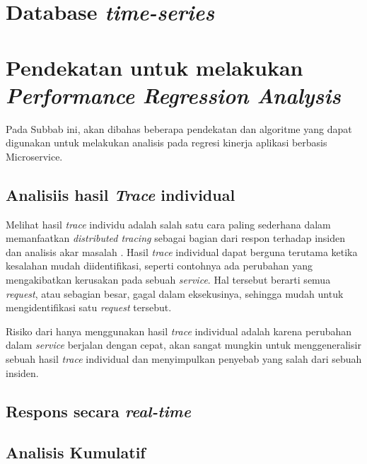 \section{Database \textit{time-series}}

\section{Pendekatan untuk melakukan \textit{Performance Regression Analysis}}
Pada Subbab ini, akan dibahas beberapa pendekatan dan algoritme yang dapat digunakan untuk melakukan analisis pada regresi kinerja aplikasi berbasis Microservice.
\label{ch2-algo}


\subsection{Analisiis hasil \textit{Trace} individual}
Melihat hasil \textit{trace} individu adalah salah satu cara paling sederhana dalam memanfaatkan \textit{distributed tracing} sebagai bagian dari respon terhadap insiden dan analisis akar masalah \citep{parker2020distributed}. Hasil \textit{trace} individual dapat berguna terutama ketika kesalahan mudah diidentifikasi, seperti contohnya ada perubahan yang mengakibatkan kerusakan pada sebuah \textit{service}. Hal tersebut berarti semua \textit{request}, atau sebagian besar, gagal dalam eksekusinya, sehingga mudah untuk mengidentifikasi satu \textit{request} tersebut.

Risiko dari hanya menggunakan hasil \textit{trace} individual adalah karena perubahan dalam \textit{service} berjalan dengan cepat, akan sangat mungkin untuk menggeneralisir sebuah hasil \textit{trace} individual dan menyimpulkan penyebab yang salah dari sebuah insiden. 




\subsection{Respons secara \textit{real-time}}
\label{approach-realtime}


\subsection{Analisis Kumulatif}
\label{approach-cumulative}

